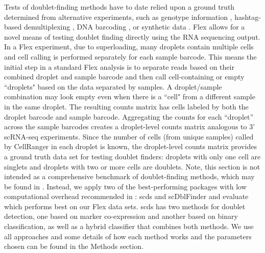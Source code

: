 \documentclass[unnumsec,webpdf,modern,large]{oup-authoring-template}
\begin{document}
	Tests of doublet-finding methods have to date relied upon a ground truth determined from alternative experiments, such as genotype information 
	\citep{Neavin2024},
	hashtag-based demultiplexing 
	\citep{Curion2024}, 
	DNA barcoding \citep{Zhang2024}, 
	or synthetic data 
	\citep{Xi2021}.	
	Flex allows for a novel means of testing doublet finding directly using the RNA sequencing output. 
	In a Flex experiment, due to superloading, many droplets contain multiple cells and cell calling is performed separately for each sample barcode. 
	This means the initial step in a standard Flex analysis is to separate reads based on their combined droplet and sample barcode and then call cell-containing or empty ``droplets" based on the data separated by samples. 
	A droplet/sample combination may look empty even when there is a ``cell" from a different sample in the same droplet. 
	The resulting counts matrix has cells labeled by both the droplet barcode and sample barcode. 
	Aggregating the counts for each ``droplet” across the sample barcodes creates a droplet-level counts matrix analogous to 3’ scRNA-seq experiments. 
	Since the number of cells (from unique samples) called by CellRanger in each droplet is known, the droplet-level counts matrix provides a ground truth data set for testing doublet finders: droplets with only one cell are singlets and droplets with two or more cells are doublets. 
	Note, this section is not intended as a comprehensive benchmark of doublet-finding methods, which may be found in 
	\citep{Neavin2024}. 
	Instead, we apply two of the best-performing packages with low computational overhead recommended in 
	\citep{Neavin2024}: 
	scds 
	\citep{Bais2020} 
	and scDblFinder 
	\citep{Germain2021} 
	and evaluate which performs best on our Flex data sets. 
	scds has two methods for doublet detection, one based on marker co-expression and another based on binary classification, as well as a hybrid classifier that combines both methods. 
	We use all approaches and some details of how each method works and the parameters chosen can be found in the Methods section. 
		
\end{document}
